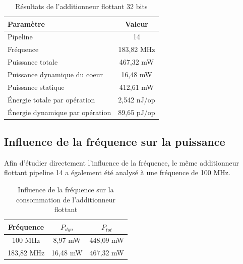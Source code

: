 \documentclass[12pt,a4paper]{article}
\begin{document}
\begin{table}[H]
    \centering

    \caption{Résultats de l'additionneur flottant 32 bits}

    \begin{tabular}{lc}
        \toprule

        \textbf{Paramètre} &
        \textbf{Valeur} \\

        \midrule

        Pipeline & 14 \\
        Fréquence & 183,82 MHz \\
        Puissance totale & 467,32 mW \\
        Puissance dynamique du coeur & 16,48 mW \\
        Puissance statique & 412,61 mW \\
        Énergie totale par opération & 2,542 nJ/op \\
        Énergie dynamique par opération & 89,65 pJ/op \\

        \bottomrule
    \end{tabular}
\end{table}



\subsection{Influence de la fréquence sur la puissance}

Afin d'étudier directement l'influence de la fréquence,
le même additionneur flottant pipeline 14 a également été
analysé à une fréquence de 100 MHz.

\begin{table}[H]
    \centering

    \caption{Influence de la fréquence sur la consommation
    de l'additionneur flottant}

    \begin{tabular}{ccc}
        \toprule

        \textbf{Fréquence} &
        \textbf{$P_{dyn}$} &
        \textbf{$P_{tot}$} \\

        \midrule

        100 MHz
        & 8,97 mW
        & 448,09 mW \\

        183,82 MHz
        & 16,48 mW
        & 467,32 mW \\

        \bottomrule
    \end{tabular}
\end{table}
\end{document}
